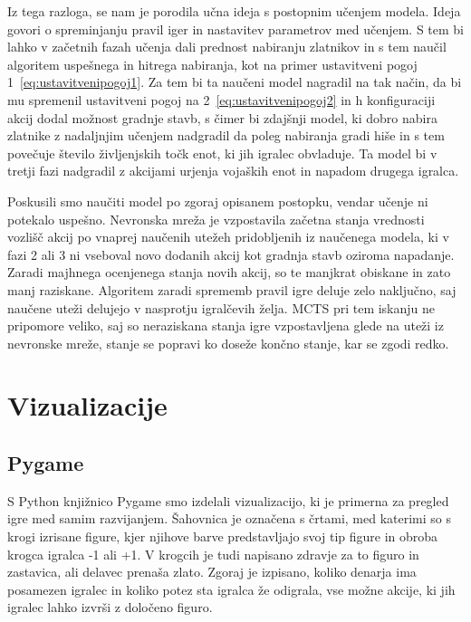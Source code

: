 \documentclass[a4paper, 12pt]{book}
\begin{document}
Iz tega razloga, se nam je porodila učna ideja s postopnim učenjem modela. 
Ideja govori o spreminjanju pravil iger in nastavitev parametrov med učenjem.
S tem bi lahko v začetnih fazah učenja dali prednost nabiranju zlatnikov in s tem naučil algoritem uspešnega in hitrega nabiranja, kot na primer ustavitveni pogoj 1~\ref{eq:ustavitvenipogoj1}.
Za tem bi ta naučeni model nagradil na tak način, da bi mu spremenil ustavitveni pogoj na 2~\ref{eq:ustavitvenipogoj2} in h konfiguraciji akcij dodal možnost gradnje stavb, s čimer bi zdajšnji model, ki dobro nabira zlatnike z nadaljnjim učenjem nadgradil da poleg nabiranja gradi hiše in s tem povečuje število življenjskih točk enot, ki jih igralec obvladuje.
Ta model bi v tretji fazi nadgradil z akcijami urjenja vojaških enot in napadom drugega igralca.

Poskusili smo naučiti model po zgoraj opisanem postopku, vendar učenje ni potekalo uspešno.
Nevronska mreža je vzpostavila začetna stanja vrednosti vozlišč akcij po vnaprej naučenih utežeh pridobljenih iz naučenega modela, ki v fazi 2 ali 3 ni vseboval novo dodanih akcij kot gradnja stavb oziroma napadanje.
Zaradi majhnega ocenjenega stanja novih akcij, so te manjkrat obiskane in zato manj raziskane.
Algoritem zaradi sprememb pravil igre deluje zelo naključno, saj naučene uteži delujejo v nasprotju igralčevih želja.
MCTS pri tem iskanju ne pripomore veliko, saj so neraziskana stanja igre vzpostavljena glede na uteži iz nevronske mreže, stanje  se popravi ko doseže končno stanje, kar se zgodi redko.

\chapter{Vizualizacije}
\label{chvizualizacija}

\section{Pygame}
S Python knjižnico Pygame smo izdelali vizualizacijo, ki je primerna za pregled igre med samim razvijanjem. 
Šahovnica je označena s črtami, med katerimi so s krogi izrisane figure, kjer njihove barve predstavljajo svoj tip figure in obroba krogca igralca -1 ali +1.
V krogcih je tudi napisano zdravje za to figuro in zastavica, ali delavec prenaša zlato.
Zgoraj je izpisano, koliko denarja ima posamezen igralec in koliko potez sta igralca že odigrala, vse možne akcije, ki jih igralec lahko izvrši z določeno figuro.
\end{document}
